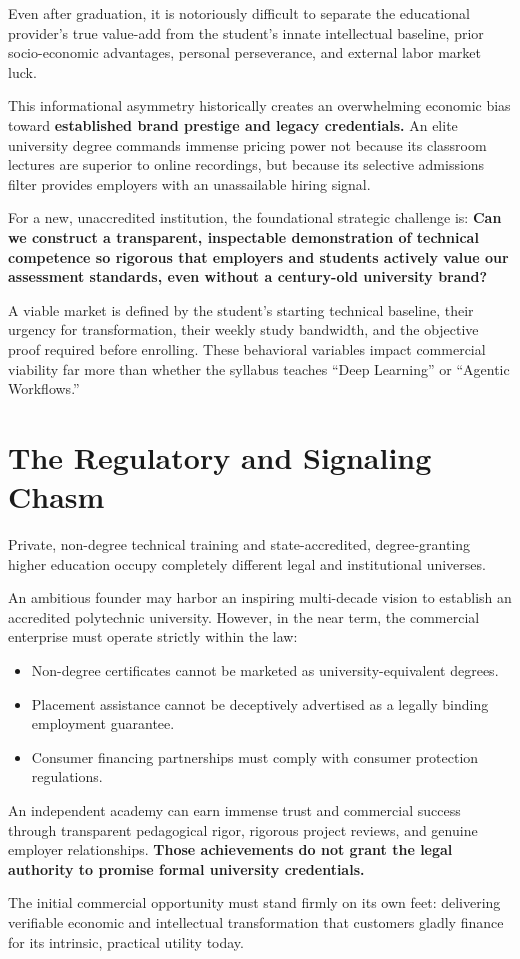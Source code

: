 Even after graduation, it is notoriously difficult to separate the educational provider's true value-add from the student's innate intellectual baseline, prior socio-economic advantages, personal perseverance, and external labor market luck.

This informational asymmetry historically creates an overwhelming economic bias toward \textbf{established brand prestige and legacy credentials.} An elite university degree commands immense pricing power not because its classroom lectures are superior to online recordings, but because its selective admissions filter provides employers with an unassailable hiring signal.

For a new, unaccredited institution, the foundational strategic challenge is: \textbf{Can we construct a transparent, inspectable demonstration of technical competence so rigorous that employers and students actively value our assessment standards, even without a century-old university brand?}

A viable market is defined by the student's starting technical baseline, their urgency for transformation, their weekly study bandwidth, and the objective proof required before enrolling. These behavioral variables impact commercial viability far more than whether the syllabus teaches ``Deep Learning'' or ``Agentic Workflows.''

\section{The Regulatory and Signaling Chasm}

Private, non-degree technical training and state-accredited, degree-granting higher education occupy completely different legal and institutional universes.

An ambitious founder may harbor an inspiring multi-decade vision to establish an accredited polytechnic university. However, in the near term, the commercial enterprise must operate strictly within the law:
\begin{itemize}[leftmargin=12pt,itemsep=1pt,topsep=1pt]
  \item Non-degree certificates cannot be marketed as university-equivalent degrees.
  \item Placement assistance cannot be deceptively advertised as a legally binding employment guarantee.
  \item Consumer financing partnerships must comply with consumer protection regulations.
\end{itemize}

An independent academy can earn immense trust and commercial success through transparent pedagogical rigor, rigorous project reviews, and genuine employer relationships. \textbf{Those achievements do not grant the legal authority to promise formal university credentials.}

The initial commercial opportunity must stand firmly on its own feet: delivering verifiable economic and intellectual transformation that customers gladly finance for its intrinsic, practical utility today.
